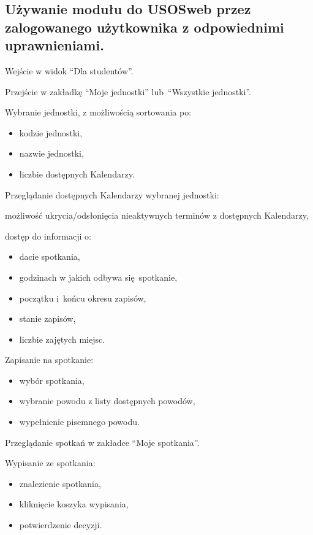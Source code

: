 \documentclass[licencjacka]{pracamgr}
\begin{document}
\subsection{Używanie modułu do USOSweb przez zalogowanego użytkownika z odpowiednimi uprawnieniami.}
	\begin{step}
			\item Wejście w widok \enquote{Dla studentów}.
			\item Przejście w zakładkę \enquote{Moje jednostki} lub~\enquote{Wszystkie jednostki}.
			\item Wybranie jednostki, z możliwością sortowania po:
				\begin{itemize}
					\item kodzie jednostki,
					\item nazwie jednostki,
					\item liczbie dostępnych Kalendarzy. 
				\end{itemize}
			\item Przeglądanie dostępnych Kalendarzy wybranej jednostki:
				\begin{step}
					\item możliwość ukrycia/odsłonięcia nieaktywnych terminów z dostępnych Kalendarzy,
					\item dostęp do informacji o:
						\begin{itemize}
							\item dacie spotkania,
							\item godzinach w jakich odbywa się~spotkanie,
							\item początku i~końcu okresu zapisów,
							\item stanie zapisów,
							\item liczbie zajętych miejsc.
						\end{itemize}
				\end{step}
			\item Zapisanie na spotkanie:
				\begin{itemize}
					\item wybór spotkania,
					\item wybranie powodu z listy dostępnych powodów,
					\item wypełnienie pisemnego powodu.
				\end{itemize}
			\item Przeglądanie spotkań w zakładce \enquote{Moje spotkania}.
				
			\item Wypisanie ze spotkania:
				\begin{itemize}
					\item znalezienie spotkania,
					\item kliknięcie koszyka wypisania,
					\item potwierdzenie decyzji.
				\end{itemize}
	\end{step}
	
\end{document}
